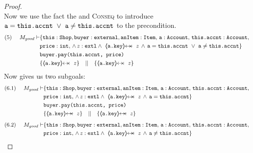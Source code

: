 \begin{proof}
\\
Now we use the fact the  and \textsc{Conseq} to introduce $\prg{a} = \prg{this.accnt}\ \vee\ \prg{a} \not= \prg{this.accnt}$ to the precondition.
\small
\begin{align*}
\text{(5)} \ \ \ \ 
M_{good} \vdash & \{  \prg{this}:\prg{Shop}, \prg{buyer} : \prg{external}, 
				  \prg{anItem} : \prg{Item},\, \prg{a}:\prg{Account},\,
				  \prg{this.accnt}:\prg{Account},\, \\
				& \prg{price} : \prg{int},\,
				  \wedge\, 
				  \external z \wedge\ 
				  {\protectedFrom{\prg{a.key}}{z}}\, \wedge \,
				  \prg{a} = \prg{this.accnt}\ \vee\ \prg{a} \not= \prg{this.accnt} \} \\
		  		& \prg{buyer.pay(this.accnt, price)}\ \\  
		  		& \{ {\protectedFrom{\prg{a.key}}{z}}  \} \ \ \  || \ \ \ \{ {\protectedFrom{\prg{a.key}}{z}} \}
\end{align*}
\normalsize
Now  gives us two subgoals:
\small
\begin{align*}
\text{(6.1)} \ \ \ \ 
M_{good} \vdash & \{  \prg{this}:\prg{Shop}, \prg{buyer} : \prg{external}, 
				  \prg{anItem} : \prg{Item},\, \prg{a}:\prg{Account},\,
				  \prg{this.accnt}:\prg{Account},\, \\
				& \prg{price} : \prg{int},\,
				  \wedge\, 
				  \external z \wedge\ 
				  {\protectedFrom{\prg{a.key}}{z}}\, \wedge \,
				  \prg{a} = \prg{this.accnt} \} \\
		  		& \prg{buyer.pay(this.accnt, price)}\ \\  
		  		& \{ {\protectedFrom{\prg{a.key}}{z}}  \} \ \ \  || \ \ \ \{ {\protectedFrom{\prg{a.key}}{z}} \}
\end{align*}
\normalsize
\small
\begin{align*}
\text{(6.2)} \ \ \ \ 
M_{good} \vdash & \{  \prg{this}:\prg{Shop}, \prg{buyer} : \prg{external}, 
				  \prg{anItem} : \prg{Item},\, \prg{a}:\prg{Account},\,
				  \prg{this.accnt}:\prg{Account},\, \\
				& \prg{price} : \prg{int},\,
				  \wedge\, 
				  \external z \wedge\ 
				  {\protectedFrom{\prg{a.key}}{z}}\, \wedge \,
				  \prg{a} \not= \prg{this.accnt} \} \\

\end{align*}
\end{proof}
